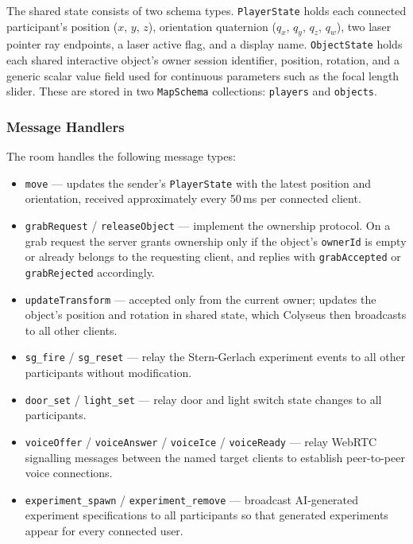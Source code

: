 The shared state consists of two schema types. \texttt{PlayerState} holds
each connected participant's position ($x$, $y$, $z$), orientation
quaternion ($q_x$, $q_y$, $q_z$, $q_w$), two laser pointer ray endpoints,
a laser active flag, and a display name. \texttt{ObjectState} holds each
shared interactive object's owner session identifier, position, rotation,
and a generic scalar value field used for continuous parameters such as
the focal length slider. These are stored in two \texttt{MapSchema}
collections: \texttt{players} and \texttt{objects}.

\subsubsection{Message Handlers}

The room handles the following message types:

\begin{itemize}
  \item \texttt{move} --- updates the sender's \texttt{PlayerState} with
        the latest position and orientation, received approximately every
        50\,ms per connected client.
  \item \texttt{grabRequest} / \texttt{releaseObject} --- implement the
        ownership protocol. On a grab request the server grants ownership
        only if the object's \texttt{ownerId} is empty or already belongs
        to the requesting client, and replies with \texttt{grabAccepted}
        or \texttt{grabRejected} accordingly.
  \item \texttt{updateTransform} --- accepted only from the current owner;
        updates the object's position and rotation in shared state, which
        Colyseus then broadcasts to all other clients.
  \item \texttt{sg\_fire} / \texttt{sg\_reset} --- relay the
        Stern-Gerlach experiment events to all other participants without
        modification.
  \item \texttt{door\_set} / \texttt{light\_set} --- relay door and light
        switch state changes to all participants.
  \item \texttt{voiceOffer} / \texttt{voiceAnswer} / \texttt{voiceIce} /
        \texttt{voiceReady} --- relay WebRTC signalling messages between
        the named target clients to establish peer-to-peer voice
        connections.
  \item \texttt{experiment\_spawn} / \texttt{experiment\_remove} ---
        broadcast AI-generated experiment specifications to all
        participants so that generated experiments appear for every
        connected user.
\end{itemize}


